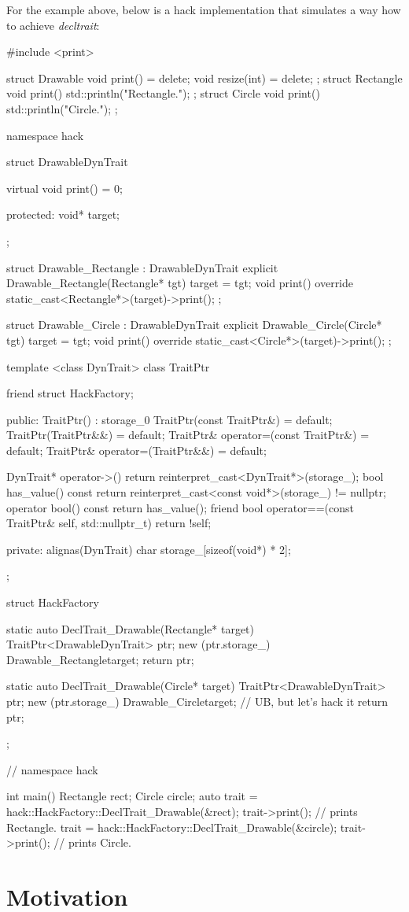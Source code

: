 \documentclass{article}
\begin{document}
For the example above, below is a hack implementation that simulates a way how to achieve \textit{decltrait}:
\begin{codeblock}
#include <print>

struct Drawable {
  void print() = delete;
  void resize(int) = delete;
};
struct Rectangle {
  void print() { std::println("Rectangle."); }
};
struct Circle {
  void print() { std::println("Circle."); }
};

namespace hack {

struct DrawableDynTrait {
  virtual void print() = 0;

 protected:
  void* target;
};

struct Drawable_Rectangle : DrawableDynTrait {
  explicit Drawable_Rectangle(Rectangle* tgt) { target = tgt; }
  void print() override { static_cast<Rectangle*>(target)->print(); }
};

struct Drawable_Circle : DrawableDynTrait {
  explicit Drawable_Circle(Circle* tgt) { target = tgt; }
  void print() override { static_cast<Circle*>(target)->print(); }
};

template <class DynTrait>
class TraitPtr {
  friend struct HackFactory;

 public:
  TraitPtr() : storage_{0} {}
  TraitPtr(const TraitPtr&) = default;
  TraitPtr(TraitPtr&&) = default;
  TraitPtr& operator=(const TraitPtr&) = default;
  TraitPtr& operator=(TraitPtr&&) = default;

  DynTrait* operator->()
  { return reinterpret_cast<DynTrait*>(storage_); }
  bool has_value() const {
    return reinterpret_cast<const void*>(storage_) != nullptr;
  }
  operator bool() const { return has_value(); }
  friend bool operator==(const TraitPtr& self, std::nullptr_t)
  { return !self; }

 private:
  alignas(DynTrait) char storage_[sizeof(void*) * 2];
};

struct HackFactory {
  static auto DeclTrait_Drawable(Rectangle* target) {
    TraitPtr<DrawableDynTrait> ptr;
    new (ptr.storage_) Drawable_Rectangle{target};
    return ptr;
  }

  static auto DeclTrait_Drawable(Circle* target) {
    TraitPtr<DrawableDynTrait> ptr;
    new (ptr.storage_) Drawable_Circle{target};  // UB, but let's hack it
    return ptr;
  }
};

}  // namespace hack

int main() {
  Rectangle rect;
  Circle circle;
  auto trait = hack::HackFactory::DeclTrait_Drawable(&rect);
  trait->print();  // prints Rectangle.
  trait = hack::HackFactory::DeclTrait_Drawable(&circle);
  trait->print();  // prints Circle.
}

\end{codeblock}

\section{Motivation}
\end{document}
